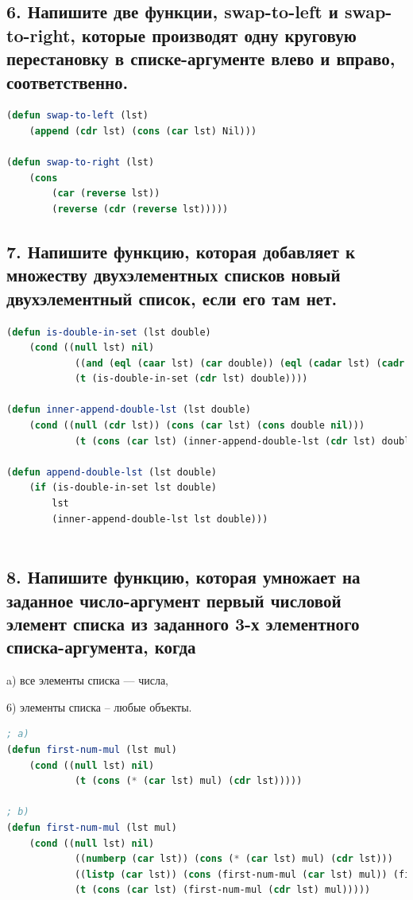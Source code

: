 \documentclass[12pt]{report}
\begin{document}
\subsection*{6. Напишите две функции, swap-to-left и swap-to-right, которые производят одну круговую
	перестановку в списке-аргументе влево и вправо, соответственно.}

\begin{lstlisting}[label=6xd, caption=Решение задания №6, language=lisp]
(defun swap-to-left (lst) 
	(append (cdr lst) (cons (car lst) Nil)))

(defun swap-to-right (lst)
	(cons
		(car (reverse lst))
		(reverse (cdr (reverse lst)))))

\end{lstlisting}

\newpage
\subsection*{7. Напишите функцию, которая добавляет к множеству двухэлементных списков новый
	двухэлементный список, если его там нет.}

\begin{lstlisting}[label=6xd, caption=Решение задания №7, language=lisp]	
(defun is-double-in-set (lst double) 
	(cond ((null lst) nil) 
			((and (eql (caar lst) (car double)) (eql (cadar lst) (cadr double))) t)
			(t (is-double-in-set (cdr lst) double))))
			
(defun inner-append-double-lst (lst double)
	(cond ((null (cdr lst)) (cons (car lst) (cons double nil)))
			(t (cons (car lst) (inner-append-double-lst (cdr lst) double)))))
			
(defun append-double-lst (lst double)
	(if (is-double-in-set lst double)
		lst
		(inner-append-double-lst lst double)))
	
\end{lstlisting}

\subsection*{8. Напишите функцию, которая умножает на заданное число-аргумент первый числовой
	элемент списка из заданного 3-х элементного списка-аргумента, когда}

a) все элементы списка --- числа,

6) элементы списка -- любые объекты.

\begin{lstlisting}[label=6xd, caption=Решение задания №8, language=lisp]
; a)
(defun first-num-mul (lst mul) 
	(cond ((null lst) nil)
			(t (cons (* (car lst) mul) (cdr lst)))))
			
; b)
(defun first-num-mul (lst mul)
	(cond ((null lst) nil)
			((numberp (car lst)) (cons (* (car lst) mul) (cdr lst)))
			((listp (car lst)) (cons (first-num-mul (car lst) mul)) (first-num-mul (cdr lst) mul))
			(t (cons (car lst) (first-num-mul (cdr lst) mul)))))

\end{lstlisting}
\end{document}

